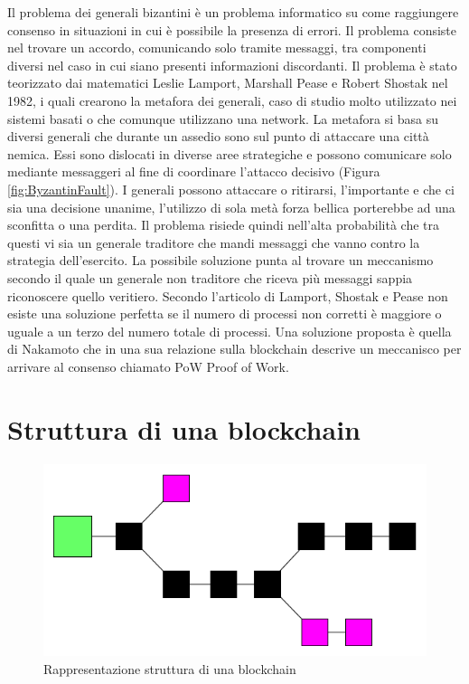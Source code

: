 \documentclass[a4paper]{report}
\begin{document}
Il problema dei generali bizantini è un problema informatico su come raggiungere consenso in situazioni in cui è possibile la presenza di errori. Il problema consiste nel trovare un accordo, comunicando solo tramite messaggi, tra componenti diversi nel caso in cui siano presenti informazioni discordanti. Il problema è stato teorizzato dai matematici Leslie Lamport, Marshall Pease e Robert Shostak nel 1982, i quali crearono la metafora dei generali, caso di studio molto utilizzato nei sistemi basati o che comunque utilizzano una network. La metafora si basa su diversi generali che durante un assedio sono sul punto di attaccare una città nemica. Essi sono dislocati in diverse aree strategiche e possono comunicare solo mediante messaggeri al fine di coordinare l'attacco decisivo (Figura \ref{fig:ByzantinFault}). I generali possono attaccare o ritirarsi, l'importante e che ci sia una decisione unanime, l'utilizzo di sola metà forza bellica porterebbe ad una sconfitta o una perdita. Il problema risiede quindi nell'alta probabilità che tra questi vi sia un generale traditore che mandi messaggi che vanno contro la strategia dell'esercito. La possibile soluzione punta al trovare un meccanismo secondo il quale un generale non traditore che riceva più messaggi sappia riconoscere quello veritiero. Secondo l'articolo di Lamport, Shostak e Pease non esiste una soluzione perfetta se il numero di processi non corretti è maggiore o uguale a un terzo del numero totale di processi. Una soluzione proposta è quella di Nakamoto che in una sua relazione sulla blockchain descrive un meccanisco per arrivare al consenso chiamato PoW Proof of Work.

\section{Struttura di una blockchain}
\begin{figure}[h]
	\includegraphics[width=\textwidth]{bl1}
	\centering
	\caption{Rappresentazione struttura di una blockchain}
	\label{fig:blockchain1}
\end{figure}
\end{document}
